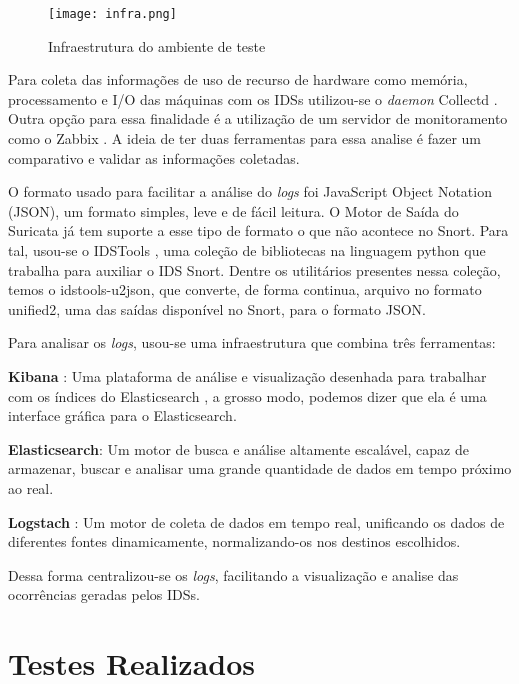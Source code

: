 \begin{figure}[!htb]
\centering
\caption{Infraestrutura do ambiente de teste}
\texttt{[image: infra.png]}
\label{fig:infra-ambiente}
\end{figure}

Para coleta das informações de uso de recurso de hardware como memória, processamento e I/O das máquinas com os IDSs utilizou-se o \textit{daemon} Collectd \cite{collectd}. Outra opção para essa finalidade é a utilização de um servidor de monitoramento como o Zabbix \cite{zabbix}. A ideia de ter duas ferramentas para essa analise é fazer um comparativo e validar as informações coletadas.

O formato usado para facilitar a análise do \textit{logs} foi JavaScript Object Notation (JSON), um formato simples, leve e de fácil leitura. O Motor de Saída do Suricata já tem suporte a esse tipo de formato o que não acontece no Snort. Para tal, usou-se o IDSTools \cite{py-idstools}, uma coleção de bibliotecas na linguagem python que trabalha para auxiliar o IDS Snort. Dentre os utilitários presentes nessa coleção, temos o idstools-u2json, que converte, de forma continua, arquivo no formato unified2, uma das saídas disponível no Snort, para o formato JSON.

Para analisar os \textit{logs}, usou-se uma infraestrutura que combina três ferramentas:

\begin{alineas}
\item \textbf{Kibana} \cite{kibana}: Uma plataforma de análise e visualização desenhada para trabalhar com os índices do Elasticsearch \cite{elasticsearch}, a grosso modo, podemos dizer que ela é uma interface gráfica para o Elasticsearch. 
\item \textbf{Elasticsearch}: Um motor de busca e análise altamente escalável, capaz de armazenar, buscar e analisar uma grande quantidade de dados em tempo próximo ao real. 
\item \textbf{Logstach} \cite{logstach}: Um motor de coleta de dados em tempo real, unificando os dados de diferentes fontes dinamicamente, normalizando-os nos destinos escolhidos.
\end{alineas}

Dessa forma centralizou-se os \textit{logs}, facilitando a visualização e analise das ocorrências geradas pelos IDSs. 

\section{Testes Realizados} \label{sec:testes}

